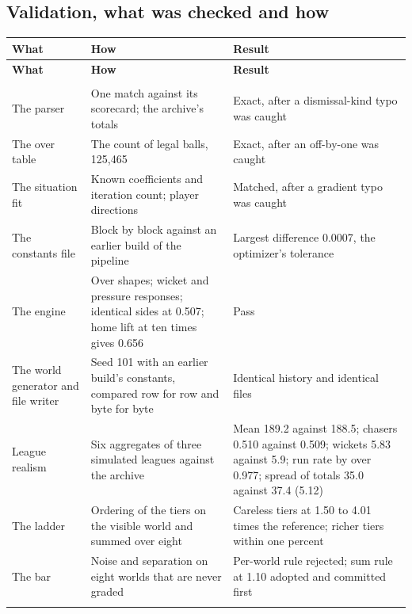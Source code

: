 \documentclass[11pt,letterpaper]{article}
\begin{document}
\subsection{Validation, what was checked and how}

\begin{small}
\begin{longtable}{>{\raggedright\arraybackslash}p{}>{\raggedright\arraybackslash}p{}>{\raggedright\arraybackslash}p{}}
\toprule
\textbf{What} & \textbf{How} & \textbf{Result} \\ \midrule
\endfirsthead
\toprule
\textbf{What} & \textbf{How} & \textbf{Result} \\ \midrule
\endhead
\midrule \multicolumn{3}{r}{\footnotesize continued on the next page} \\ \endfoot
\bottomrule \endlastfoot
The parser & One match against its scorecard; the archive's totals & Exact, after a dismissal-kind typo was caught \\ \addlinespace[2pt]
The over table & The count of legal balls, 125,465 & Exact, after an off-by-one was caught \\ \addlinespace[2pt]
The situation fit & Known coefficients and iteration count; player directions & Matched, after a gradient typo was caught \\ \addlinespace[2pt]
The constants file & Block by block against an earlier build of the pipeline & Largest difference 0.0007, the optimizer's tolerance \\ \addlinespace[2pt]
The engine & Over shapes; wicket and pressure responses; identical sides at 0.507; home lift at ten times gives 0.656 & Pass \\ \addlinespace[2pt]
The world generator and file writer & Seed 101 with an earlier build's constants, compared row for row and byte for byte & Identical history and identical files \\ \addlinespace[2pt]
League realism & Six aggregates of three simulated leagues against the archive & Mean 189.2 against 188.5; chasers 0.510 against 0.509; wickets 5.83 against 5.9; run rate by over 0.977; spread of totals 35.0 against 37.4 (5.12) \\ \addlinespace[2pt]
The ladder & Ordering of the tiers on the visible world and summed over eight & Careless tiers at 1.50 to 4.01 times the reference; richer tiers within one percent \\ \addlinespace[2pt]
The bar & Noise and separation on eight worlds that are never graded & Per-world rule rejected; sum rule at 1.10 adopted and committed first \\ \addlinespace[2pt]

\end{longtable}
\end{small}
\end{document}
